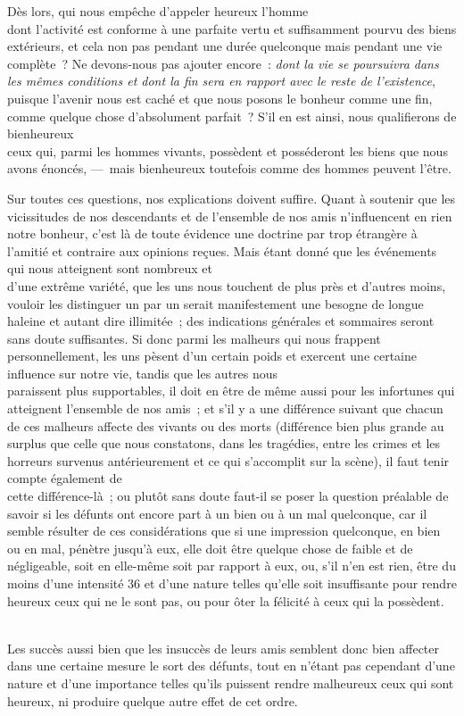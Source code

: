 \documentclass[french,twoside]{book} %
\begin{document}
Dès lors, qui nous empêche d’appeler heureux l’homme \\
dont l’activité est conforme à une parfaite vertu et suffisamment pourvu des biens extérieurs, et cela non pas pendant une durée quelconque mais pendant une vie complète ? Ne devons-nous pas ajouter encore : {\itshape dont la vie se poursuivra dans les mêmes conditions et dont la fin sera en rapport avec le reste de l’existence}, puisque l’avenir nous est caché et que nous posons le bonheur comme une fin, comme quelque chose d’absolument parfait ? S’il en est ainsi, nous qualifierons de bienheureux \\
ceux qui, parmi les hommes vivants, possèdent et posséderont les biens que nous avons énoncés, — mais bienheureux toutefois comme des hommes peuvent l’être.\par
Sur toutes ces questions, nos explications doivent suffire. Quant à soutenir que les vicissitudes de nos descendants et de l’ensemble de nos amis n’influencent en rien notre bonheur, c’est là de toute évidence une doctrine par trop étrangère à l’amitié et contraire aux opinions reçues. Mais étant donné que les événements qui nous atteignent sont nombreux et \\
d’une extrême variété, que les uns nous touchent de plus près et d’autres moins, vouloir les distinguer un par un serait manifestement une besogne de longue haleine et autant dire illimitée ; des indications générales et sommaires seront sans doute suffisantes. Si donc parmi les malheurs qui nous frappent personnellement, les uns pèsent d’un certain poids et exercent une certaine influence sur notre vie, tandis que les autres nous \\
paraissent plus supportables, il doit en être de même aussi pour les infortunes qui atteignent l’ensemble de nos amis ; et s’il y a une différence suivant que chacun de ces malheurs affecte des vivants ou des morts (différence bien plus grande au surplus que celle que nous constatons, dans les tragédies, entre les crimes et les horreurs survenus antérieurement et ce qui s’accomplit sur la scène), il faut tenir compte également de \\
cette différence-là ; ou plutôt sans doute faut-il se poser la question préalable de savoir si les défunts ont encore part à un  bien ou à un mal quelconque, car il semble résulter de ces considérations que si une impression quelconque, en bien ou en mal, pénètre jusqu’à eux, elle doit être quelque chose de faible et de négligeable, soit en elle-même soit par rapport à eux, ou, s’il n’en est rien, être du moins d’une intensité 36 et d’une nature telles qu’elle soit insuffisante pour rendre heureux ceux qui ne le sont pas, ou pour ôter la félicité à ceux qui la possèdent.\par
\\
Les succès aussi bien que les insuccès de leurs amis semblent donc bien affecter dans une certaine mesure le sort des défunts, tout en n’étant pas cependant d’une nature et d’une importance telles qu’ils puissent rendre malheureux ceux qui sont heureux, ni produire quelque autre effet de cet ordre.
\end{document}
